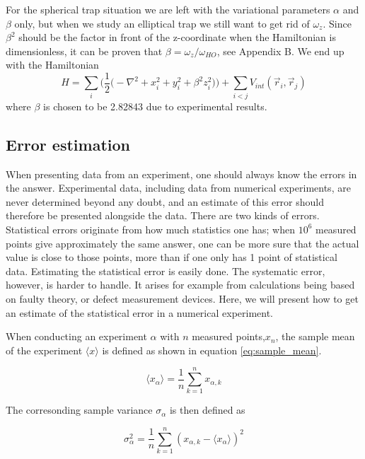 \documentclass[norsk,a4paper,12pt]{article}
\begin{document}
For the spherical trap situation we are left with the variational parameters $\alpha$ and $\beta$ only, but when we study an elliptical trap we still want to get rid of $\omega_z$. Since $\beta^2$ should be the factor in front of the z-coordinate when the Hamiltonian is dimensionless, it can be proven that $\beta=\omega_z/\omega_{HO}$, see Appendix B. We end up with the Hamiltonian
\begin{equation}
H=\sum_i\bigg(\frac{1}{2}\Big(-\nabla^2 + x_i^2 + y_i^2 + \beta^2z_i^2\Big)\bigg)+\sum_{i<j}V_{int}(\vec{r}_i,\vec{r}_j)
\end{equation} 
where $\beta$ is chosen to be 2.82843 due to experimental results.

\subsection{Error estimation}
When presenting data from an experiment, one should always know the errors in the answer. Experimental data, including data from numerical experiments, are never determined beyond any doubt, and an estimate of this error should therefore be presented alongside the data. 
There are two kinds of errors. Statistical errors originate from how much statistics one has; when $10^6$ measured points give approximately the same answer, one can be more sure that the actual value is close to those points, more than if one only has 1 point of statistical data. Estimating the statistical error is easily done. The systematic error, however, is harder to handle. It arises for example from calculations being based on faulty theory, or defect measurement devices. Here, we will present how to get an estimate of the statistical error in a numerical experiment.
\par 
\vspace{3mm}
When conducting an experiment $\alpha$ with $n$ measured points,$x_n$, the sample mean of the experiment $\langle x \rangle$ is defined as shown in equation \ref{eq:sample_mean}.

\begin{equation}
\label{eq:sample_mean}
\langle x_{\alpha} \rangle = \frac{1}{n} \sum_{k=1}^n x_{\alpha,k}
\end{equation}

The corresonding sample variance $\sigma_{\alpha}$ is then defined as

\begin{equation}
\sigma_{\alpha}^2 = \frac{1}{n} \sum_{k=1}^n (x_{\alpha,k} - \langle x_{\alpha} \rangle )^2
\end{equation}
\end{document}
